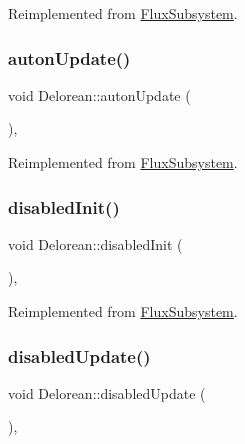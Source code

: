 Reimplemented from \hyperlink{classFluxSubsystem_a142cb34f612412e26bd0049e037dbe60}{Flux\+Subsystem}.

\mbox{\label{classDelorean_a17c9b875c9c0d3c9b9dadd5838bfedfd}} 
\subsubsection{\texorpdfstring{auton\+Update()}{autonUpdate()}}
{\footnotesize\ttfamily void Delorean\+::auton\+Update (\begin{DoxyParamCaption}{ }\end{DoxyParamCaption})\hspace{0.3cm}{\ttfamily [override]}, {\ttfamily [virtual]}}



Reimplemented from \hyperlink{classFluxSubsystem_aceed900af22503022b8d1278f3693f77}{Flux\+Subsystem}.

\mbox{\label{classDelorean_ae054ba79b38b46d20e50becb5d31884c}} 
\subsubsection{\texorpdfstring{disabled\+Init()}{disabledInit()}}
{\footnotesize\ttfamily void Delorean\+::disabled\+Init (\begin{DoxyParamCaption}{ }\end{DoxyParamCaption})\hspace{0.3cm}{\ttfamily [override]}, {\ttfamily [virtual]}}



Reimplemented from \hyperlink{classFluxSubsystem_aa0b8fde8aa5094627d15d24e545e1da4}{Flux\+Subsystem}.

\mbox{\label{classDelorean_acc8f7d93dd894233d16f34316d363983}} 
\subsubsection{\texorpdfstring{disabled\+Update()}{disabledUpdate()}}
{\footnotesize\ttfamily void Delorean\+::disabled\+Update (\begin{DoxyParamCaption}{ }\end{DoxyParamCaption})\hspace{0.3cm}{\ttfamily [override]}, {\ttfamily [virtual]}}



